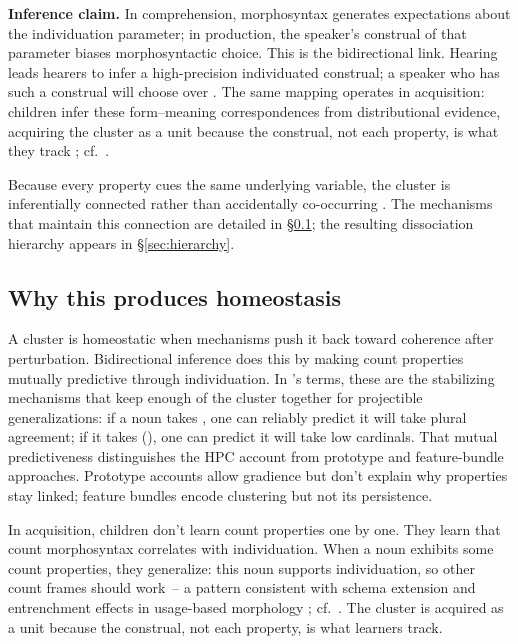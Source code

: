 \documentclass[12pt,a4paper]{article}
\begin{document}
\textbf{Inference claim.} In comprehension, morphosyntax generates expectations about the individuation parameter; in production, the speaker's construal of that parameter biases morphosyntactic choice. This is the bidirectional link. Hearing  leads hearers to infer a high-precision individuated construal; a speaker who has such a construal will choose  over . The same mapping operates in acquisition: children infer these form--meaning correspondences from distributional evidence, acquiring the cluster as a unit because the construal, not each property, is what they track \citep{bybee2010}; cf.\ \textcite{tomasello2003}.

Because every property cues the same underlying variable, the cluster is inferentially connected rather than accidentally co-occurring \citep{boyd1991,khalidi2013}. The mechanisms that maintain this connection are detailed in \S\ref{sec:homeostasis}; the resulting dissociation hierarchy appears in \S\ref{sec:hierarchy}.

\subsection{Why this produces homeostasis}\label{sec:homeostasis}

A cluster is homeostatic when mechanisms push it back toward coherence after perturbation. Bidirectional inference does this by making count properties mutually predictive through individuation. In \textcite{boyd1991}'s terms, these are the stabilizing mechanisms that keep enough of the cluster together for projectible generalizations: if a noun takes , one can reliably predict it will take plural agreement; if it takes (), one can predict it will take low cardinals. That mutual predictiveness distinguishes the HPC account from prototype and feature-bundle approaches. Prototype accounts allow gradience but don't explain why properties stay linked; feature bundles encode clustering but not its persistence.

In acquisition, children don't learn count properties one by one. They learn that count morphosyntax correlates with individuation. When a noun exhibits some count properties, they generalize: this noun supports individuation, so other count frames should work~-- a pattern consistent with schema extension and entrenchment effects in usage-based morphology \citep{bybee2010}; cf.\ \textcite{tomasello2003}. The cluster is acquired as a unit because the construal, not each property, is what learners track.
\end{document}
